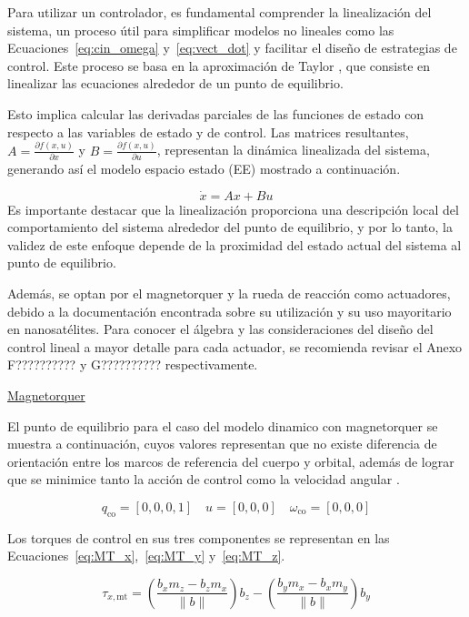 Para utilizar un controlador, es fundamental comprender la linealización del sistema, un proceso útil para simplificar modelos no lineales como las Ecuaciones~\ref{eq:cin_omega} y~\ref{eq:vect_dot} y facilitar el diseño de estrategias de control. Este proceso se basa en la aproximación de Taylor \cite{ref42}, que consiste en linealizar las ecuaciones alrededor de un punto de equilibrio.

Esto implica calcular las derivadas parciales de las funciones de estado con respecto a las variables de estado y de control. Las matrices resultantes, $A = \frac{\partial f(x,u)}{\partial x}$ y $B = \frac{\partial f(x,u)}{\partial u}$, representan la dinámica linealizada del sistema, generando así el modelo espacio estado (EE) mostrado a continuación.

\[
	\dot{x} = A x + B u
\]
Es importante destacar que la linealización proporciona una descripción local del comportamiento del sistema alrededor del punto de equilibrio, y por lo tanto, la validez de este enfoque depende de la proximidad del estado actual del sistema al punto de equilibrio.

Además, se optan por el magnetorquer\cite{ref14} y la rueda de reacción\cite{ref41} como actuadores, debido a la documentación encontrada sobre su utilización y su uso mayoritario en nanosatélites. Para conocer el álgebra y las consideraciones del diseño del control lineal a mayor detalle para cada actuador, se recomienda revisar el Anexo F?????????? y G?????????? respectivamente. 

\underline{Magnetorquer}

El punto de equilibrio para el caso del modelo dinamico con magnetorquer se muestra a continuación, cuyos valores representan que no existe diferencia de orientación entre los marcos de referencia del cuerpo y orbital, además de lograr que se minimice tanto la acción de control como la velocidad angular \cite{ref14}.

\[
	q_{\text{co}} = [0, 0, 0, 1] \quad	u = [0, 0, 0] \quad	\omega_{\text{co}} = [0, 0, 0]
\]



Los torques de control en sus tres componentes se representan en las Ecuaciones~\ref{eq:MT_x},~\ref{eq:MT_y} y~\ref{eq:MT_z}.


\begin{equation}
	\tau_{x,\text{mt}} = \left( \frac{b_x m_z - b_z m_x}{\|b\|} \right) b_z - \left( \frac{b_y m_x - b_x m_y}{\|b\|} \right) b_y
	\label{eq:MT_x}
\end{equation}


